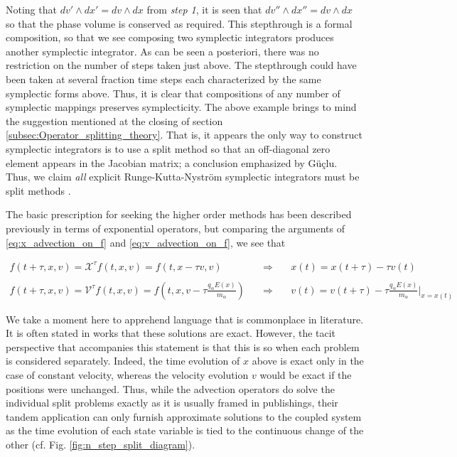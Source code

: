 \documentclass[11pt,titlepage]{report}
\begin{document}
\noindent Noting that $dv'\wedge dx' = dv \wedge dx$ from \emph{step 1}, it is seen that $dv'' \wedge dx'' = dv \wedge dx$ so that the phase volume is conserved as required. This stepthrough is a formal composition, so that we see composing two symplectic integrators produces another symplectic integrator. As can be seen a posteriori, there was no restriction on the number of steps taken just above. The stepthrough could have been taken at several fraction time steps each characterized by the same symplectic forms above. Thus, it is clear that compositions of any number of symplectic mappings preserves symplecticity. The above example brings to mind the suggestion mentioned at the closing of section \ref{subsec:Operator_splitting_theory}. That is, it appears the only way to construct symplectic integrators is to use a split method so that an off-diagonal zero element appears in the Jacobian matrix; a conclusion emphasized by G\"{u}\c{c}lu. Thus, we claim \emph{all} explicit Runge-Kutta-Nystr\"{o}m symplectic integrators must be split methods \cite[p.716]{Guclu14}.

The basic prescription for seeking the higher order methods has been described previously in terms of exponential operators, but comparing the arguments of \eqref{eq:x_advection_on_f} and \eqref{eq:v_advection_on_f}, we see that

 \begin{eqnarray*}
 f(t+\tau , x, v) = \mathcal{X}^{\tau}f(t,x,v) = f(t,x - \tau v,v) \quad  & \Rightarrow & \quad x(t)  =  x(t + \tau ) - \tau v(t) \\
 && \\
  f(t+\tau , x, v) = \mathcal{V}^{\tau}f(t,x,v) = f(t,x,v - \tau \tfrac{q_{\alpha}E(x)}{m_{\alpha}} )\quad & \Rightarrow & \quad v(t) =  v(t + \tau ) - \tau \frac{q_{\alpha}E(x)}{m_{\alpha}}\biggr|_{x = x(t)}
 \end{eqnarray*}

 \noindent We take a moment here to apprehend language that is commonplace in literature. It is often stated in works that these solutions are exact. However, the tacit perspective that accompanies this statement is that this is so when each problem is considered separately. Indeed, the time evolution of $x$ above is exact only in the case of constant velocity, whereas the velocity evolution $v$ would be exact if the positions were unchanged. Thus, while the advection operators do solve the individual split problems exactly as it is usually framed in publishings, their tandem application can only furnish approximate solutions to the coupled system as the time evolution of each state variable is tied to the continuous change of the other (cf. Fig. \ref{fig:n_step_split_diagram}).
\end{document}
